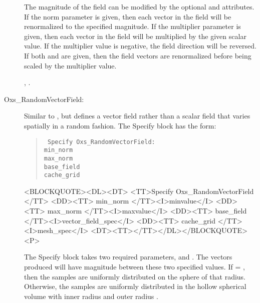 \begin{description}
   The magnitude of the field can be modified by the optional
    and  attributes.  If the norm
   parameter is given, then each vector in the field will be
   renormalized to the specified magnitude.  If the multiplier parameter
   is given, then each vector in the field will be multiplied by the
   given scalar value.  If the multiplier value is negative, the field
   direction will be reversed.  If both  and 
   are given, then the field vectors are renormalized before being
   scaled by the multiplier value.

\begin{ExampleMifs}
  , .
\end{ExampleMifs}

\item[Oxs\_RandomVectorField:]
%
Similar to
%
, but defines a vector field rather than a scalar field that
varies spatially in a random fashion.  The Specify block has the form:
      \begin{latexonly}
      \begin{quote}\tt
      Specify Oxs\_RandomVectorField: \ocb\\
       \bi min\_norm \\
       \bi max\_norm \\
       \bi base\_field \\
       \bi cache\_grid \\
      \ccb
      \end{quote}
      \end{latexonly}
      \begin{rawhtml}
      <BLOCKQUOTE><DL><DT>
      <TT>Specify Oxs_RandomVectorField {</TT>
      <DD><TT> min_norm </TT><I>minvalue</I>
      <DD><TT> max_norm </TT><I>maxvalue</I>
      <DD><TT> base_field </TT><I>vector_field_spec</I>
      <DD><TT> cache_grid </TT><I>mesh_spec</I>
      <DT><TT>}</TT></DL></BLOCKQUOTE><P>
      \end{rawhtml}
The Specify block takes two required parameters, 
and .  The vectors produced will have magnitude
between these two specified values.  If  = ,
then the samples are uniformly distributed on the sphere of that radius.
Otherwise, the samples are uniformly distributed in the hollow spherical
volume with inner radius  and outer radius .


\end{description}
